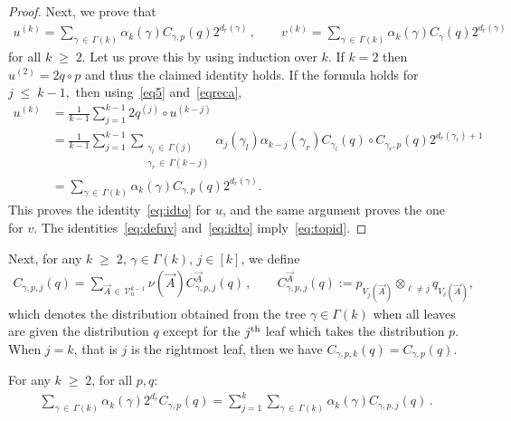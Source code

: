 \documentclass[AHL,Unicode,longabstracts,published]{cedram}
\renewcommand{\leq}{\;\leqslant\;}
\renewcommand{\geq}{\;\geqslant\;}
\newcommand{\cV}{\mathcal{V}}
\let\g=\gamma
\let\G=\Gamma
\begin{document}
\begin{proof}
Next, we prove that
\begin{align}\label{eq:idto}
u^{(k)}=\sum_{\gamma\,\in\,\Gamma(k)}\alpha_k(\gamma)C_{\gamma,p}(q)2^{d_r(\gamma)}\,,\qquad v^{(k)}=\sum_{\gamma\,\in\,\Gamma(k)}\alpha_k(\gamma)C_{\gamma}(q)2^{d_r(\gamma)}
\end{align}
for all $k \geq 2$. Let us prove this by using induction over $k$. If $k=2$ then $u^{(2)} = 2 q\circ p$ and thus the claimed identity holds. If the formula holds for $j \leq k-1,$ then using~\eqref{eq5} and~\eqref{eqreca},
\begin{align*}
u^{(k)}&=\frac{1}{k-1}\sum_{j=1}^{k-1}2q^{(j)}\circ u^{(k-j)} \\
&=\frac{1}{k-1}\sum_{j=1}^{k-1}\sum_{\substack{\gamma_l\,\in\,\Gamma(j) \\ \gamma_r\,\in\,\Gamma(k-j)}}\alpha_j(\gamma_l)\alpha_{k-j}(\gamma_r) C_{\gamma_l}(q) \circ C_{\gamma_r, p}(q)2^{d_r(\gamma_r)+1} \\
&=\sum_{\gamma\,\in\,\Gamma(k)}\alpha_k(\gamma)C_{\gamma,p}(q)2^{d_r(\gamma)}.
\end{align*}
This proves the identity~\eqref{eq:idto} for $u$, and the same argument proves the one for $v$. The identities~\eqref{eq:defuv} and~\eqref{eq:idto} imply~\eqref{eq:topid}.
\end{proof}

Next, for any $k\geq 2$, $\g\in\G(k)$, $j\in[k]$, we define
\begin{align}\label{eq11}
C_{\gamma,p,j}(q)= \sum_{\vec A\,\in\, \cV_n^{k-1}}\nu(\vec A) C^{\vec A}_{\gamma,p,j}(q)\,,\qquad C^{\vec A}_{\gamma,p,j}(q):= p_{V_j(\vec A)} \otimes _{\ell\neq j} q_{V_\ell(\vec A)},
\end{align}
which denotes the distribution obtained from the tree $\gamma\in\G(k)$ when all leaves are given the distribution $q$ except for the $j^{\rm th}$ leaf which takes the distribution $p$. When $j=k$, that is $j$ is the rightmost leaf, then we have $C_{\gamma,p,k}(q) = C_{\gamma,p}(q)$.

\begin{lemm}\label{lem:dr}
For any $k\geq 2$, for all $p,q$:
\begin{align}\label{eq18}
\sum_{\gamma\,\in\,\Gamma(k)}\alpha_k(\gamma)2^{d_r}C_{\gamma,p}(q) =\sum_{j=1}^k\sum_{\gamma\,\in\,\Gamma(k)}\alpha_k(\gamma)C_{\gamma,p,j}(q)
\,.
\end{align}
\end{lemm}
\end{document}
